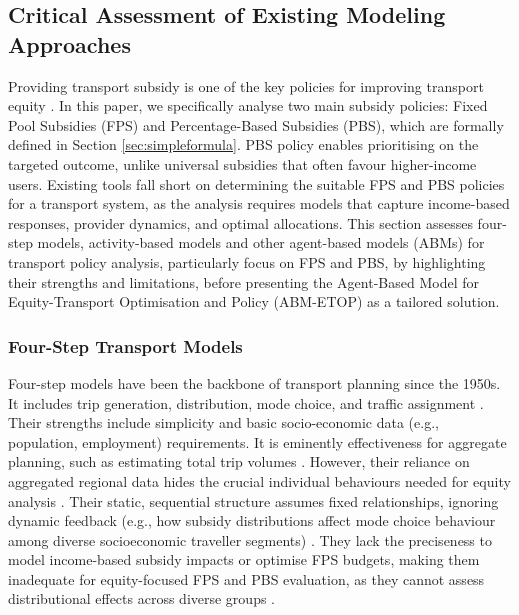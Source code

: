 \documentclass[a4paper,fleqn]{cas-sc}
\begin{document}
\subsection{Critical Assessment of Existing Modeling Approaches}\label{sec:model_critique}

Providing transport subsidy is one of the key policies for improving transport equity \citep{ Lucas2016}. In this paper, we specifically analyse two main subsidy policies: Fixed Pool Subsidies (FPS) and Percentage-Based Subsidies (PBS), which are formally defined in Section \ref{sec:simpleformula}. PBS policy enables prioritising on the targeted outcome, unlike universal subsidies that often favour higher-income users. Existing tools fall short on determining the suitable FPS and PBS policies for a transport system, as the analysis requires models that capture income-based responses, provider dynamics, and optimal allocations. This section assesses four-step models, activity-based models and other agent-based models (ABMs) for transport policy analysis, particularly focus on FPS and PBS, by highlighting their strengths and limitations, before presenting the Agent-Based Model for Equity-Transport Optimisation and Policy (ABM-ETOP) as a tailored solution.

\subsubsection{Four-Step Transport Models}
Four-step models have been the backbone of transport planning since the 1950s. It includes trip generation, distribution, mode choice, and traffic assignment \citep{McNally2007a}. Their strengths include simplicity and basic socio-economic data (e.g., population, employment) requirements. It is eminently effectiveness for aggregate planning, such as estimating total trip volumes \citep{McNally2007a}. However, their reliance on aggregated regional data hides the crucial individual behaviours needed for equity analysis \citep{Martens2006}. Their static, sequential structure assumes fixed relationships, ignoring dynamic feedback (e.g., how subsidy distributions affect mode choice behaviour among diverse socioeconomic traveller segments) \citep{McNally2007a}. They lack the preciseness to model income-based subsidy impacts or optimise FPS budgets, making them inadequate for equity-focused FPS and PBS evaluation, as they cannot assess distributional effects across diverse groups \citep{Zhao2016}.
\end{document}
